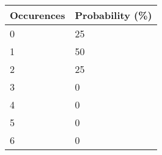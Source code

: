 \begin{tabular}{ll}
    Occurences & Probability (\%) \\
    \hline
    0          & 25               \\
    1          & 50               \\
    2          & 25               \\
    3          & 0                \\
    4          & 0                \\
    5          & 0                \\
    6          & 0                \\
    \hline
\end{tabular}